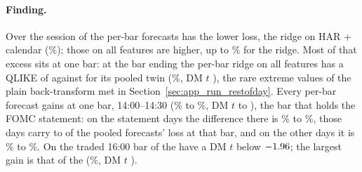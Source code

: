 %
\paragraph{Finding.} Over the session \runappPbSessBelow{} of the
\runappPbN{} per-bar forecasts has the lower loss, the ridge on HAR + calendar
(\runappPbSessLo{}\%); those on all features are higher, up to
\runappPbSessHi{}\% for the ridge. Most of that excess sits at one bar: at the
bar ending \runappPbWorstBar{} the per-bar ridge on all features has a QLIKE of
\runappPbWorstQ{} against \runappPbWorstPooledQ{} for its pooled twin
(\runappPbWorstPct{}\%, DM $t$ \runappPbWorstDm{}), the rare extreme values of
the plain back-transform met in Section~\ref{sec:app_run_restofday}. Every
per-bar forecast gains at one bar, 14:00--14:30 (\runappPbFomcBarLo{}\% to
\runappPbFomcBarHi{}\%, DM $t$ \runappPbFomcBarDmLo{} to
\runappPbFomcBarDmHi{}), the bar that holds the FOMC statement: on the
\runappPbFomcDays{} statement days the difference there is
\runappPbFomcLo{}\% to \runappPbFomcHi{}\%, those days carry
\runappPbShareLo{} to \runappPbShareHi{} of the pooled forecasts' loss at that
bar, and on the other \runappPbOtherDays{} days it is \runappPbOtherLo{}\% to
\runappPbOtherHi{}\%. On the traded 16:00 bar \runappPbSixteenSig{} of the
\runappPbN{} have a DM $t$ below $-1.96{}$; the largest gain is that
of the \runappPbSixteenWho{} (\runappPbSixteen{}\%, DM $t$ \runappPbSixteenDm{}).

